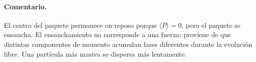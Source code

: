 \documentclass[11pt,a4paper]{article}
\numberwithin{equation}{section}
\begin{document}
\paragraph{Comentario.}
El centro del paquete permanece en reposo porque $\langle P\rangle=0$, pero el paquete se ensancha. El ensanchamiento no corresponde a una fuerza: proviene de que distintas componentes de momento acumulan fases diferentes durante la evolución libre. Una partícula más masiva se dispersa más lentamente.
\end{document}
